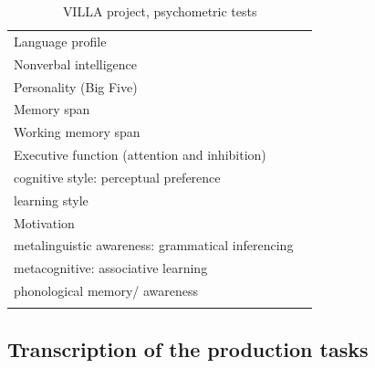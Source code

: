 \begin{table}
    \begin{tabularx}{\textwidth}{XX}
    \lsptoprule
        Language profile\\
        Nonverbal intelligence\\
        Personality (Big Five)\\
        Memory span\\
        Working memory span\\
        Executive function (attention and inhibition)\\
        cognitive style: perceptual preference\\
        learning style\\
        Motivation\\
        metalinguistic awareness: grammatical inferencing\\
        metacognitive: associative learning\\
        phonological memory/ awareness\\
    \lspbottomrule
    \end{tabularx}
    \caption{VILLA project, psychometric tests}
    \label{tab:02:10}
\end{table}

\subsection{Transcription of the production tasks}\label{sec:02:4.1}

